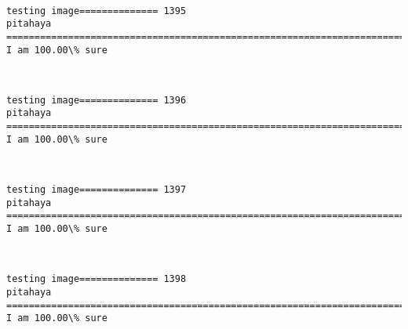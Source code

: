 \documentclass[11pt]{article}
\begin{document}
    \begin{center}
    \end{center}
    { \hspace*{\fill} \\}
    
    \begin{Verbatim}[commandchars=\\\{\}]
testing image============== 1395
pitahaya
============================================================================
I am 100.00\% sure

    \end{Verbatim}

    \begin{center}
    \end{center}
    { \hspace*{\fill} \\}
    
    \begin{Verbatim}[commandchars=\\\{\}]
testing image============== 1396
pitahaya
============================================================================
I am 100.00\% sure

    \end{Verbatim}

    \begin{center}
    \end{center}
    { \hspace*{\fill} \\}
    
    \begin{Verbatim}[commandchars=\\\{\}]
testing image============== 1397
pitahaya
============================================================================
I am 100.00\% sure

    \end{Verbatim}

    \begin{center}
    \end{center}
    { \hspace*{\fill} \\}
    
    \begin{Verbatim}[commandchars=\\\{\}]
testing image============== 1398
pitahaya
============================================================================
I am 100.00\% sure

    \end{Verbatim}
\end{document}
